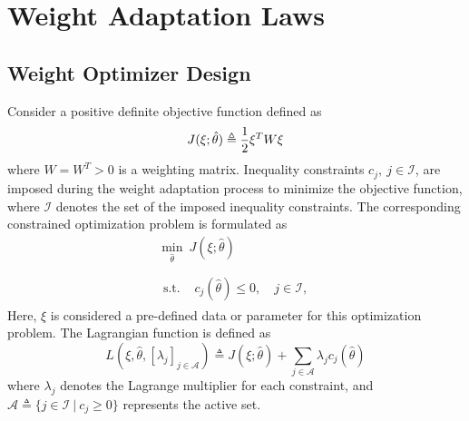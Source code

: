 \documentclass[lettersize,journal]{IEEEtran}
\begin{document}
\section{Weight Adaptation Laws}\label{sec:adap_laws}

\subsection{Weight Optimizer Design}

Consider a positive definite objective function defined as 
\begin{equation}
    J(\xi;\hat\theta)\triangleq 
    {1\over 2} \xi^T   W\xi
\end{equation}
where $W=W^T  >0$ is a weighting matrix.
Inequality constraints $c_j,\ j\in\mathcal{I}$, are imposed during the weight adaptation process to minimize the objective function, where $\mathcal I$ denotes the set of the imposed inequality constraints. The corresponding constrained optimization problem is formulated as
\begin{equation}
    \begin{matrix}
        \min_{\hat\theta} \ J(\xi;\hat\theta)
        \\ \\
        \begin{aligned}
        \text{s.t. }&c_{j}(\hat\theta) 
        \le0, \quad j\in\mathcal{I},
        \end{aligned}
    \end{matrix}
    \label{eq. train obj}
\end{equation}
Here, $\xi$ is considered a pre-defined data or parameter for this optimization problem. The Lagrangian function is defined as
\begin{equation}
    L(\xi,\hat\theta,[\lambda_j]_{j\in\mathcal A}) \triangleq J(\xi;\hat\theta) + 
    \sum_{j\in\mathcal A}
    \lambda_{j}
    c_{j}(\hat\theta)
\end{equation}
where $\lambda_j$ denotes the Lagrange multiplier for each constraint, and $\mathcal A \triangleq \{j\in\mathcal I\ |\ c_j\ge 0\}$ represents the active set.
\end{document}
